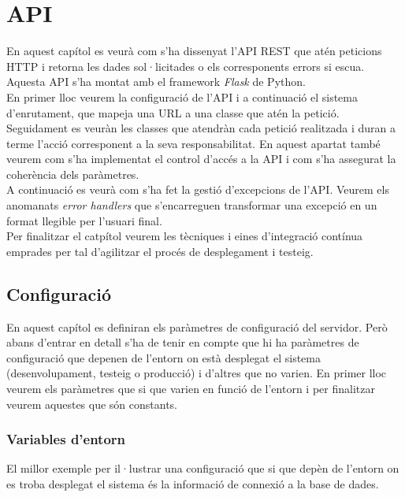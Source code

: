 \section{\ac{API}} \label{sec_api2}

En aquest capítol es veurà com s'ha dissenyat l'\ac{API} \ac{REST} que atén peticions \ac{HTTP} i retorna les dades sol·licitades o els corresponents errors si escua. Aquesta \ac{API} s'ha montat amb el framework \emph{Flask} de Python. \\

En primer lloc veurem la configuració de l'\ac{API} i a continuació el sistema d'enrutament, que mapeja una \ac{URL} a una classe que atén la petició.\\

Seguidament es veuràn les classes que atendràn cada petició realitzada i duran a terme l'acció corresponent a la seva responsabilitat. En aquest apartat també veurem com s'ha implementat el control d'accés a la \ac{API} i com s'ha assegurat la coherència dels paràmetres.\\

A continuació es veurà com s'ha fet la gestió d'excepcions de l'\ac{API}. Veurem els anomanats \emph{error handlers} que s'encarreguen transformar una excepció en un format llegible per l'usuari final.\\

Per finalitzar el catpítol veurem les tècniques i eines d'integració contínua emprades per tal d'agilitzar el procés de desplegament i testeig.

\subsection{Configuració}

En aquest capítol es definiran els paràmetres de configuració del servidor. Però abans d'entrar en detall s'ha de tenir en compte que hi ha paràmetres de configuració que depenen de l'entorn on està desplegat el sistema (desenvolupament, testeig o producció) i d'altres que no varien. En primer lloc veurem els paràmetres que si que varien en funció de l'entorn i per finalitzar veurem aquestes que són constants.

\subsubsection{Variables d'entorn}

El millor exemple per il·lustrar una configuració que si que depèn de l'entorn on es troba desplegat el sistema és la informació de connexió a la base de dades.\\

